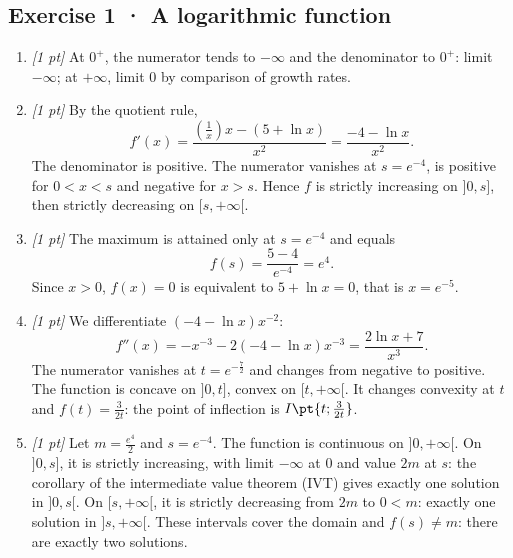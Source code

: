 \subsection*{Exercise 1 · A logarithmic function}\begin{enumerate}

\item \textit{[1 pt]} At $0^+$, the numerator tends to $-\infty$ and the denominator to $0^+$: limit $-\infty$; at $+\infty$, limit $0$ by comparison of growth rates.

\item \textit{[1 pt]} By the quotient rule,
\[f'(x)=\frac{(\frac{1}{x})x-(5+\ln x)}{x^2}=\frac{-4-\ln x}{x^2}.\]
The denominator is positive. The numerator vanishes at $s=e^{-4}$, is positive for $0<x<s$ and negative for $x>s$. Hence $f$ is strictly increasing on $]0,s]$, then strictly decreasing on $[s,+\infty[$.

\item \textit{[1 pt]} The maximum is attained only at $s=e^{-4}$ and equals
\[f(s)=\frac{5- 4}{e^{-4}}=e^{4}.\]
Since $x>0$, $f(x)=0$ is equivalent to $5+\ln x=0$, that is $x=e^{-5}$.

\item \textit{[1 pt]} We differentiate $(-4-\ln x)x^{-2}$:
\[f''(x)=-x^{-3}-2(-4-\ln x)x^{-3}=\frac{2\ln x+7}{x^3}.\]
The numerator vanishes at $t=e^{-\frac{7}{2}}$ and changes from negative to positive. The function is concave on $]0,t]$, convex on $[t,+\infty[$. It changes convexity at $t$ and $f(t)=\frac{3}{2t}$: the point of inflection is $I\pt{t;\frac{3}{2t}}$.

\item \textit{[1 pt]} Let $m=\frac{e^{4}}{2}$ and $s=e^{-4}$. The function is continuous on $]0,+\infty[$. On $]0,s]$, it is strictly increasing, with limit $-\infty$ at $0$ and value $2m$ at $s$: the corollary of the intermediate value theorem (IVT) gives exactly one solution in $]0,s[$. On $[s,+\infty[$, it is strictly decreasing from $2m$ to $0<m$: exactly one solution in $]s,+\infty[$. These intervals cover the domain and $f(s)\ne m$: there are exactly two solutions.

\end{enumerate}

